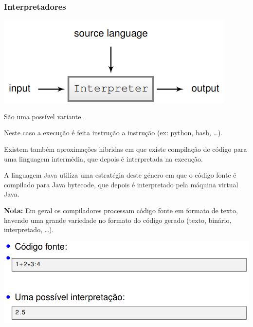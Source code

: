 \documentclass{article}
\begin{document}
\pagebreak

\subsubsection{Interpretadores}

\begin{center}
  \includegraphics[scale=0.4]{5}
\end{center}

\begin{flushleft}
  \item São uma possível variante.
  \item Neste caso a execução é feita instrução a instrução (ex: python, bash, \dots).
  \item Existem também aproximações hibridas em que existe
  compilação de código para uma linguagem intermédia,
  que depois é interpretada na execução.
  \item A linguagem Java utiliza uma estratégia deste género em
  que o código fonte é compilado para Java bytecode, que
  depois é interpretado pela máquina virtual Java.
\end{flushleft}

\begin{flushleft}
  \textbf{Nota:} Em geral os compiladores processam código fonte em
  formato de texto, havendo uma grande variedade no
  formato do código gerado (texto, binário, interpretado, \dots ).
\end{flushleft}

\begin{center}
  \includegraphics[scale=0.3]{6}
\end{center}
\end{document}
